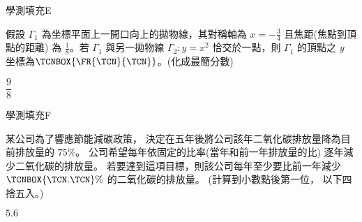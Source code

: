     \begin{QUESTION}
        \begin{ExamInfo}{98}{學測}{填充}{E}
        \end{ExamInfo}
        \begin{ExamAnsRateInfo}{13}{33}{6}{0}
        \end{ExamAnsRateInfo}
        \begin{QBODY}
            假設 $\Gamma_1$ 為坐標平面上一開口向上的拋物線，其對稱軸為 $x=-\frac{3}{4}$ 且焦距(焦點到頂點的距離) 為 $\frac{1}{8}$。若 $\Gamma_1$ 與另一拋物線 $\Gamma_2 :y=x^2$ 恰交於一點，則 $\Gamma_1$ 的頂點之 $y$ 坐標為$\TCNBOX{\FR{\TCN}{\TCN}}$。(化成最簡分數)
        \end{QBODY}
        \begin{QFROMS}
        \end{QFROMS}
        \begin{QTAGS}\end{QTAGS}
        \begin{QANS}
            $\dfrac{9}{8}$
        \end{QANS}
        \begin{QSOLLIST}
        \end{QSOLLIST}
        \begin{QEMPTYSPACE}
        \end{QEMPTYSPACE}
    \end{QUESTION}
    \begin{QUESTION}
        \begin{ExamInfo}{98}{學測}{填充}{F}
        \end{ExamInfo}
        \begin{ExamAnsRateInfo}{6}{15}{2}{1}
        \end{ExamAnsRateInfo}
        \begin{QBODY}
            某公司為了響應節能減碳政策， 決定在五年後將公司該年二氧化碳排放量降為目前排放量的 $75 \%$。 公司希望每年依固定的比率(當年和前一年排放量的比) 逐年減少二氧化碳的排放量。 若要達到這項目標，則該公司每年至少要比前一年減少 $\TCNBOX{\TCN.\TCN} \%$ 的二氧化碳的排放量。 (計算到小數點後第一位， 以下四捨五入。)
        \end{QBODY}
        \begin{QFROMS}
        \end{QFROMS}
        \begin{QTAGS}\end{QTAGS}
        \begin{QANS}
            $5.6$
        \end{QANS}
        \begin{QSOLLIST}
        \end{QSOLLIST}
        \begin{QEMPTYSPACE}
        \end{QEMPTYSPACE}
    \end{QUESTION}
